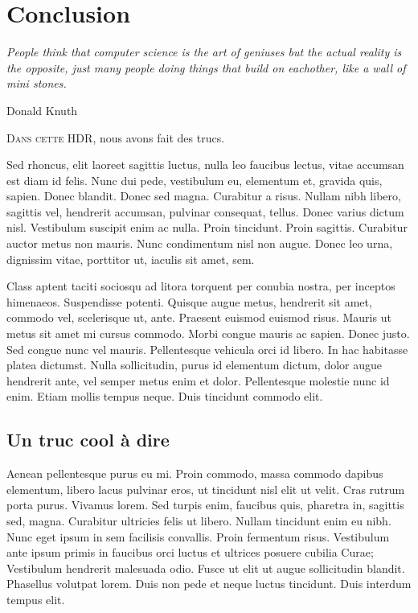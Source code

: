 \documentclass[../hdr.tex]{subfiles}
\begin{document}
\chapter*{Conclusion}
\label{chap:conclu-generale}

\epigraph{\itshape 
  People think that computer science is the art of geniuses but the actual
  reality is the opposite, just many people doing things that build on
  eachother, like a wall of mini stones.
}{Donald Knuth}

\ifSubfilesClassLoaded{%
  \tableofcontents
}{%
  \minitoc
}
\vskip2cm

\lettrine{D}{ans cette HDR}, nous avons fait des trucs.

Sed rhoncus, elit laoreet sagittis luctus, nulla leo faucibus lectus, vitae
accumsan est diam id felis. Nunc dui pede, vestibulum eu, elementum et, gravida
quis, sapien. Donec blandit. Donec sed magna. Curabitur a risus. Nullam nibh
libero, sagittis vel, hendrerit accumsan, pulvinar consequat, tellus. Donec
varius dictum nisl. Vestibulum suscipit enim ac nulla. Proin tincidunt. Proin
sagittis. Curabitur auctor metus non mauris. Nunc condimentum nisl non augue.
Donec leo urna, dignissim vitae, porttitor ut, iaculis sit amet, sem.

Class aptent taciti sociosqu ad litora torquent per conubia nostra, per inceptos
himenaeos. Suspendisse potenti. Quisque augue metus, hendrerit sit amet, commodo
vel, scelerisque ut, ante. Praesent euismod euismod risus. Mauris ut metus sit
amet mi cursus commodo. Morbi congue mauris ac sapien. Donec justo. Sed congue
nunc vel mauris. Pellentesque vehicula orci id libero. In hac habitasse platea
dictumst. Nulla sollicitudin, purus id elementum dictum, dolor augue hendrerit
ante, vel semper metus enim et dolor. Pellentesque molestie nunc id enim. Etiam
mollis tempus neque. Duis tincidunt commodo elit.

\section{Un truc cool à dire}

Aenean pellentesque purus eu mi. Proin commodo, massa commodo dapibus elementum,
libero lacus pulvinar eros, ut tincidunt nisl elit ut velit. Cras rutrum porta
purus. Vivamus lorem. Sed turpis enim, faucibus quis, pharetra in, sagittis sed,
magna. Curabitur ultricies felis ut libero. Nullam tincidunt enim eu nibh. Nunc
eget ipsum in sem facilisis convallis. Proin fermentum risus. Vestibulum ante
ipsum primis in faucibus orci luctus et ultrices posuere cubilia Curae;
Vestibulum hendrerit malesuada odio. Fusce ut elit ut augue sollicitudin
blandit. Phasellus volutpat lorem. Duis non pede et neque luctus tincidunt. Duis
interdum tempus elit.
\end{document}
